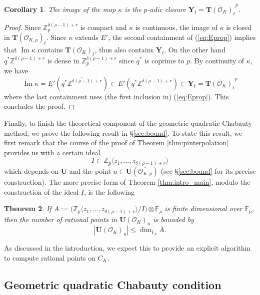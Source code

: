 \documentclass[11pt,oneside]{amsart}
\theoremstyle{plain}
\newtheorem{theorem}{Theorem}[section]
\newtheorem{corollary}[theorem]{Corollary}
\theoremstyle{definition}
\DeclareMathOperator{\im}{Im}
\def\TT{\mathbf{T}}
\def\Z{\mathbb{Z}}
\def\F{\mathbb{F}}
\def\U{\mathbf{U}}
\def\Y{\mathbf{Y}}
\def\oh{\mathcal{O}}
\begin{document}
\begin{corollary}\label{coro:imagekappa}
The image of the map $\kappa$ is the $p$-adic closure $\Y_t = \overline{\TT(\oh_K)_t}^p$. 
\end{corollary}

\begin{proof}
Since $\Z_p^{\delta(\rho-1)+r}$ is compact and $\kappa$ is continuous, the image of $\kappa$ is closed in $\TT(\oh_{K, p})_t$. Since $\kappa$ extends $E'$, the second containment of (\ref{eq:Eprop}) implies that $\im \kappa$ contains $\TT(\oh_K)_t$, thus also contains $\Y_t$. On the other hand $q^*\Z^{\delta(\rho-1)+r}$ is dense in $\Z_p^{\delta(\rho-1)+r}$ since $q^*$ is coprime to $p$. By continuity of $\kappa$, we have 
\[
\im \kappa = E'\left(\overline{q^*\Z^{\delta(\rho-1)+r}}\right) \subset \overline{E'(q^*\Z^{\delta(\rho-1)+r})}\subset \Y_t = \overline{\TT(\oh_K)_t}^p
\]
where the last containment uses (the first inclusion in) (\ref{eq:Eprop}). This concludes the proof.
\end{proof}

Finally, to finish the theoretical component of the geometric quadratic Chabauty method, we prove the following result in \S \ref{sec:bound}. To state this result, we first remark that the course of the proof of Theorem \ref{thm:pinterpolation} provides us with a certain ideal 
$$ I \subset \Z_p \langle z_1, ..., z_{\delta(\rho - 1)+ r} \rangle$$ which depends on $\U$ and the point $u \in \U(\overline{\oh_{K, p}})$
(see \S \ref{sec:bound} for its precise construction). The more precise form of Theorem \ref{thm:intro_main}, modulo the construction of the ideal $I$, is the following

\begin{theorem} \label{thm:main_rough_form}
If $\overline A := \big( \Z_p \langle z_1, ..., z_{\delta(\rho - 1)+ r} \rangle /I \big) \otimes \F_p $ is finite dimensional over $\F_p$, then the number of rational points in $\U (\oh_K)_u$ is bounded by 
$$ | \U (\oh_K)_u | \le \dim_{\F_p} \overline A. $$
\end{theorem}

As discussed in the introduction, we expect this to provide an explicit algorithm to compute rational points on $C_K$. 


\subsection{Geometric quadratic Chabauty condition}\label{s:chabcondition}
\end{document}
